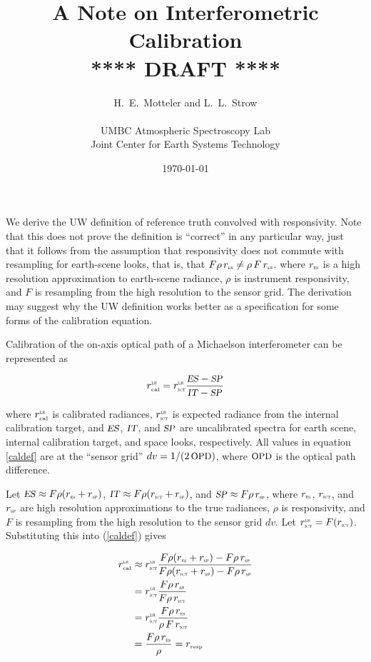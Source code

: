 \documentclass[12pt]{article}
\title{A Note on Interferometric Calibration \\
\vspace{3mm}
{****} DRAFT {****} \\
}
\author{H.~E.~Motteler and L.~L.~Strow \\
  \\
  UMBC Atmospheric Spectroscopy Lab \\
  Joint Center for Earth Systems Technology \\
}
\date{\today}
\begin{document}
\maketitle

We derive the UW definition of reference truth convolved with
responsivity.  Note that this does not prove the definition is
``correct'' in any particular way, just that it follows from the
assumption that responsivity does not commute with resampling for
earth-scene looks, that is, that $F\rho\,\rES \ne \rho\,F\,\rES$.
where $\rES$ is a high resolution approximation to earth-scene
radiance, $\rho$ is instrument responsivity, and $F$ is resampling
from the high resolution to the sensor grid.  The derivation may
suggest why the UW definition works better as a specification for
some forms of the calibration equation.

\vspace{2mm}
Calibration of the on-axis optical path of a Michaelson
interferometer can be represented as

\begin{equation}\label{caldef}
  \rcalLR = \rITLR  \frac{\ES - \SP}{\IT - \SP}
\end{equation} 

\noindent
where $\rcalLR$ is calibrated radiances, $\rITLR$ is expected
radiance from the internal calibration target, and $\ES$, $\IT$, and
$\SP$ are uncalibrated spectra for earth scene, internal calibration
target, and space looks, respectively.  All values in equation
\ref{caldef} are at the ``sensor grid'' $dv = 1/ (2\, \opd)$, where
$\opd$ is the optical path difference.

Let $\ES \approx F\rho(\rES+\rSP)$, $\IT \approx F\rho(\rIT+\rSP)$,
and $\SP \approx F\rho\,\rSP$, where $\rES$, $\rIT$, and $\rSP$ are
high resolution approximations to the true radiances, $\rho$ is
responsivity, and $F$ is resampling from the high resolution to the
sensor grid $dv$.  Let $\rITLR = F(\rIT)$.  Substituting this into
(\ref{caldef}) gives

\begin{align}
  \rcalLR &\approx \rITLR \frac{F\rho(\rES+\rSP) - F\rho\,\rSP}
                               {F\rho(\rIT+\rSP) - F\rho\,\rSP} \notag \\
          &= \rITLR \frac{F\rho\,\rES}
                         {F\rho\,\rIT} \label{cal1} \\
          &= \rITLR \frac{F\rho\,\rES}
                         {\rho\,F\,\rIT} \label{cal2} \\
          &= \frac{F\rho\,\rES} 
                  {\rho} = \rresp \label{calUW}
\end{align} 
\end{document}
